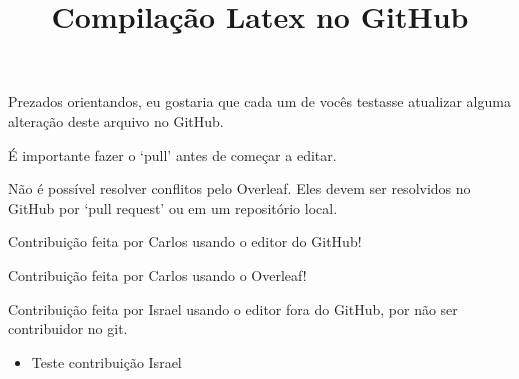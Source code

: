 \documentclass{article}
\title{Compilação Latex no GitHub}
\begin{document}
\maketitle

Prezados orientandos,
eu gostaria que cada um de vocês testasse atualizar alguma alteração deste arquivo no GitHub.

É importante fazer o `pull' antes de começar a editar.

Não é possível resolver conflitos pelo Overleaf.
Eles devem ser resolvidos no GitHub por `pull request' ou em um repositório local.

Contribuição feita por Carlos usando o editor do GitHub!

Contribuição feita por Carlos usando o Overleaf!

Contribuição feita por Israel usando o editor fora do GitHub, por não ser contribuidor no git.

\begin{itemize}
	\item Teste contribuição Israel
\end{itemize}
\end{document}
